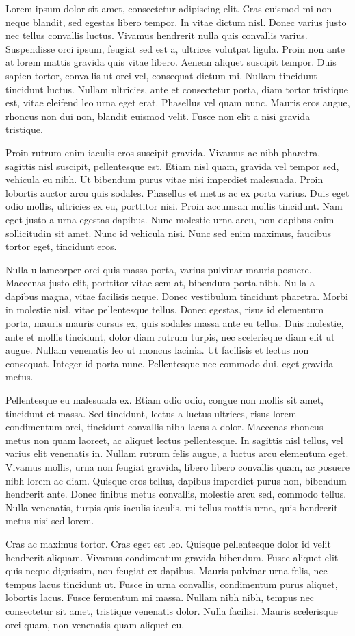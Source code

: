 \documentclass[12pt]{article}
\begin{document}
Lorem ipsum dolor sit amet, consectetur adipiscing elit. Cras euismod mi non neque blandit, sed egestas libero tempor. In vitae dictum nisl. Donec varius justo nec tellus convallis luctus. Vivamus hendrerit nulla quis convallis varius. Suspendisse orci ipsum, feugiat sed est a, ultrices volutpat ligula. Proin non ante at lorem mattis gravida quis vitae libero. Aenean aliquet suscipit tempor. Duis sapien tortor, convallis ut orci vel, consequat dictum mi. Nullam tincidunt tincidunt luctus. Nullam ultricies, ante et consectetur porta, diam tortor tristique est, vitae eleifend leo urna eget erat. Phasellus vel quam nunc. Mauris eros augue, rhoncus non dui non, blandit euismod velit. Fusce non elit a nisi gravida tristique.

Proin rutrum enim iaculis eros suscipit gravida. Vivamus ac nibh pharetra, sagittis nisl suscipit, pellentesque est. Etiam nisl quam, gravida vel tempor sed, vehicula eu nibh. Ut bibendum purus vitae nisi imperdiet malesuada. Proin lobortis auctor arcu quis sodales. Phasellus et metus ac ex porta varius. Duis eget odio mollis, ultricies ex eu, porttitor nisi. Proin accumsan mollis tincidunt. Nam eget justo a urna egestas dapibus. Nunc molestie urna arcu, non dapibus enim sollicitudin sit amet. Nunc id vehicula nisi. Nunc sed enim maximus, faucibus tortor eget, tincidunt eros.

Nulla ullamcorper orci quis massa porta, varius pulvinar mauris posuere. Maecenas justo elit, porttitor vitae sem at, bibendum porta nibh. Nulla a dapibus magna, vitae facilisis neque. Donec vestibulum tincidunt pharetra. Morbi in molestie nisl, vitae pellentesque tellus. Donec egestas, risus id elementum porta, mauris mauris cursus ex, quis sodales massa ante eu tellus. Duis molestie, ante et mollis tincidunt, dolor diam rutrum turpis, nec scelerisque diam elit ut augue. Nullam venenatis leo ut rhoncus lacinia. Ut facilisis et lectus non consequat. Integer id porta nunc. Pellentesque nec commodo dui, eget gravida metus.

Pellentesque eu malesuada ex. Etiam odio odio, congue non mollis sit amet, tincidunt et massa. Sed tincidunt, lectus a luctus ultrices, risus lorem condimentum orci, tincidunt convallis nibh lacus a dolor. Maecenas rhoncus metus non quam laoreet, ac aliquet lectus pellentesque. In sagittis nisl tellus, vel varius elit venenatis in. Nullam rutrum felis augue, a luctus arcu elementum eget. Vivamus mollis, urna non feugiat gravida, libero libero convallis quam, ac posuere nibh lorem ac diam. Quisque eros tellus, dapibus imperdiet purus non, bibendum hendrerit ante. Donec finibus metus convallis, molestie arcu sed, commodo tellus. Nulla venenatis, turpis quis iaculis iaculis, mi tellus mattis urna, quis hendrerit metus nisi sed lorem.

Cras ac maximus tortor. Cras eget est leo. Quisque pellentesque dolor id velit hendrerit aliquam. Vivamus condimentum gravida bibendum. Fusce aliquet elit quis neque dignissim, non feugiat ex dapibus. Mauris pulvinar urna felis, nec tempus lacus tincidunt ut. Fusce in urna convallis, condimentum purus aliquet, lobortis lacus. Fusce fermentum mi massa. Nullam nibh nibh, tempus nec consectetur sit amet, tristique venenatis dolor. Nulla facilisi. Mauris scelerisque orci quam, non venenatis quam aliquet eu. 
\end{document}
